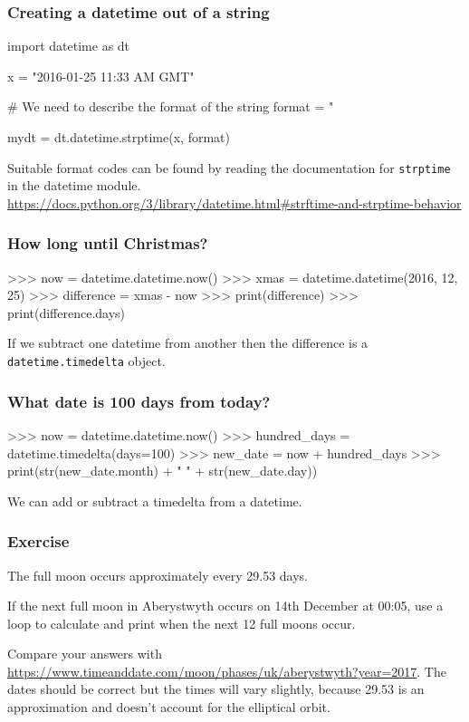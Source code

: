 \documentclass{beamer}
\begin{document}
\begin{frame}[fragile]
\frametitle{Creating a datetime out of a string}
\begin{code}
import datetime as dt

x = "2016-01-25 11:33 AM GMT"

# We need to describe the format of the string
format = "%

mydt = dt.datetime.strptime(x, format)
\end{code}

Suitable format codes can be found by reading the documentation for
\texttt{strptime} in
the datetime
module. \url{https://docs.python.org/3/library/datetime.html#strftime-and-strptime-behavior}
\end{frame}



\begin{frame}[fragile]
\frametitle{How long until Christmas?}
\begin{code}
>>> now = datetime.datetime.now()
>>> xmas = datetime.datetime(2016, 12, 25)
>>> difference = xmas - now
>>> print(difference)
>>> print(difference.days)
\end{code}
If we subtract one datetime from another then the difference is a \texttt{datetime.timedelta} object.
\end{frame}

\begin{frame}[fragile]
\frametitle{What date is 100 days from today?}
\begin{code}
>>> now = datetime.datetime.now()
>>> hundred_days = datetime.timedelta(days=100)
>>> new_date = now + hundred_days
>>> print(str(new_date.month) + " " + str(new_date.day))
\end{code}
We can add or subtract a timedelta from a datetime.
\end{frame}

\begin{frame}[fragile]
\frametitle{Exercise}
The full moon occurs approximately every 29.53 days. 

\bigskip

If the next full moon in Aberystwyth occurs on
14th December at 00:05, use a loop to calculate and print when the
next 12 full moons occur.

\bigskip

Compare your answers with
\url{https://www.timeanddate.com/moon/phases/uk/aberystwyth?year=2017}. The
dates should be correct but the times will vary slightly, because
29.53 is an approximation and doesn't account for the elliptical
orbit. 
\end{frame}
\end{document}
